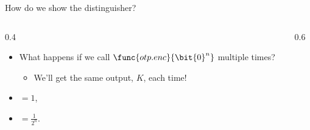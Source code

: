 \ifdefined\PRESENTATION\else\PassOptionsToClass{handout}{beamer}\fi\documentclass[aspectratio=169, lualatex]{beamer}
\begin{document}
\begin{frame}{How do we show the distinguisher?}
	\begin{columns}[c]
		\begin{column}{0.4\textwidth}
			\begin{itemize}
				\item What happens if we call $\func{otp.enc}{\bit{0}^n}$ multiple times?
				      \begin{itemize}
					      \item We'll get the same output, $K$, each time!
				      \end{itemize}
				\item {} $= 1$,
				\item {} $= \frac{1}{2^n}$.
			\end{itemize}
		\end{column}
		\begin{column}{0.6\textwidth}
			\begin{flushright}
			\end{flushright}
		\end{column}
	\end{columns}
\end{frame}
\end{document}
